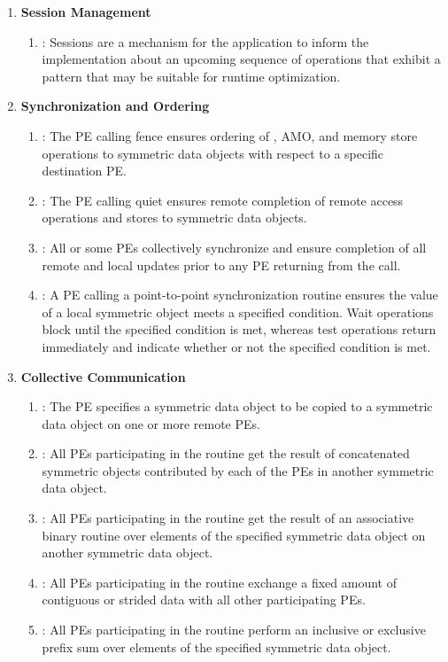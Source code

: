 \begin{enumerate}
\item \textbf{Session Management}
\begin{enumerate}
  \item {}: Sessions are a mechanism for the application to inform
      the implementation about an upcoming sequence of operations that exhibit
      a pattern that may be suitable for runtime optimization.
\end{enumerate}

\item \textbf{Synchronization and Ordering}
\begin{enumerate}
  \item {}: The \ac{PE} calling fence ensures ordering of
  \PUT, \ac{AMO}, and memory store operations
  to symmetric data objects with respect to a specific
      destination \ac{PE}.
  \item {}: The \ac{PE} calling quiet ensures remote completion of remote access
      operations and stores to symmetric data objects.
  \item {}: All or some \acp{PE} collectively synchronize and ensure
      completion of all remote and local updates prior to any \ac{PE} returning
      from the call.
  \item {}: A \ac{PE} calling a point-to-point synchronization
      routine ensures the value of a local symmetric object meets a specified
      condition.  Wait operations block until the specified condition is
      met, whereas test operations return immediately and indicate whether or
      not the specified condition is met.
\end{enumerate}

\item \textbf{Collective Communication}
\begin{enumerate}
  \item {}: The  \ac{PE} specifies a symmetric data
      object to be copied to a symmetric data object on one or more remote
      \acp{PE}.
  \item {}: All \acp{PE} participating in the routine get the result
      of concatenated symmetric objects contributed by each of the \acp{PE} in
      another symmetric data object.
  \item {}: All \acp{PE} participating in the routine get the result
      of an associative binary routine over elements of the specified symmetric
      data object on another symmetric data object.
  \item {}: All \acp{PE} participating in the routine exchange
      a fixed amount of contiguous or strided data with all other participating
      \acp{PE}.
  \item {}: All \acp{PE} participating in the routine perform an
      inclusive or exclusive prefix sum over elements of the specified
      symmetric data object.
\end{enumerate}


\end{enumerate}
